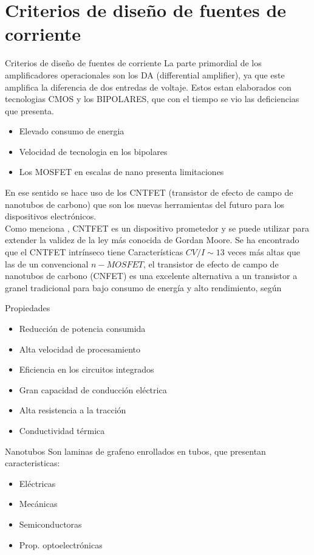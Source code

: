 \documentclass[aspectratio=169, 8pt]{beamer}
\begin{document}
\section{Criterios de diseño de fuentes de corriente}
\begin{frame}{Criterios de diseño de fuentes de corriente}
La parte primordial de los amplificadores operacionales son los DA (differential amplifier), ya que este amplifica la diferencia de dos entredas de voltaje. Estos estan elaborados con tecnologias CMOS y los BIPOLARES, que con el tiempo se vio las deficiencias que presenta.
\begin{itemize}
	\item Elevado consumo de energia
	\item Velocidad de tecnologia en los bipolares
	\item Los MOSFET en escalas de nano presenta limitaciones
\end{itemize}
En ese sentido se hace uso de los CNTFET (transistor de efecto de campo de nanotubos de carbono) que son los nuevas herramientas del futuro para los dispositivos electrónicos.\\
Como menciona \cite{Akhoon}, CNTFET es un dispositivo prometedor y se puede utilizar para extender la validez de la ley más conocida de Gordan Moore. Se ha encontrado que el CNTFET intrínseco tiene Características $CV/I \sim 13$ veces más altas que las de un convencional $n-MOSFET$, el transistor de efecto de campo de nanotubos de carbono (CNFET) es una excelente alternativa a un transistor a granel tradicional para bajo consumo de energía y alto rendimiento, según \cite{Liu}
\end{frame}
\begin{frame}{Propiedades}
\begin{itemize}
	\item Reducción de potencia consumida 
	\item Alta velocidad de procesamiento
	\item Eficiencia en los circuitos integrados 
	\item Gran capacidad de conducción eléctrica 
	\item Alta resistencia a la tracción
	\item Conductividad térmica
\end{itemize}
\begin{block}{Nanotubos}
	Son laminas de grafeno enrollados en tubos, que presentan caracteristicas: 
	\begin{itemize}
		\item Eléctricas
		\item Mecánicas
		\item Semiconductoras
		\item Prop. optoelectrónicas
	\end{itemize}
\end{block}
\end{frame}
\end{document}
